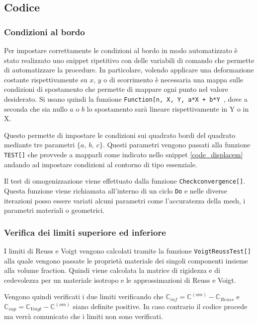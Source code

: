 \documentclass[a4paper,num-refs]{oup-contemporary}
\begin{document}
\subsection{Codice}

\subsubsection{Condizioni al bordo}

Per impostare correttamente le condizioni al bordo in modo automatizzato è stato realizzato uno snippet ripetitivo con delle variabili di comando che permette di automatizzare la procedure. In particolare, volendo applicare una deformazione costante rispettivamente su $x$, $y$ o  di scorrimento è necessaria una mappa sulle condizioni di spostamento che permette di mappare ogni punto  nel valore desiderato. Si usano quindi la funzione \texttt{Function[{n, X, Y}, a*X + b*Y }, dove a seconda che sia nullo $a$ o $b$ lo spostamento sarà lineare rispettivamente in Y o in X. 

 Questo permette di impostare le condizioni sui quadrato bordi del quadrato mediante tre parametri $\{a,\:b,\:c\}$. Questi parametri vengono passati alla funzione \texttt{TEST[]} che provvede a mapparli come indicato nello snippet  \ref{code_displacem} andando ad impostare condizioni al contorno di tipo essenziale.  

Il test di omogenizzazione viene effettuato dalla funzione \texttt{Checkconvergence[]}. Questa funzione viene richiamata all'interno di un ciclo \texttt{Do} e nelle diverse iterazioni posso essere variati alcuni parametri come l'accuratezza della mesh, i parametri materiali o geometrici. 


\subsubsection{Verifica dei limiti superiore ed inferiore}

I limiti di Reuss e Voigt vengono calcolati tramite la funzione \texttt{VoigtReussTest[]} alla quale vengono passate le proprietà materiale dei singoli componenti insieme alla volume fraction. Quindi viene calcolata la matrice di rigidezza e di cedevolezza per un materiale isotropo e le approssimazioni di Reuss e Voigt. 

Vengono quindi verificati i due limiti verificando che $\mathbb C_{inf}=\mathbb C^{(om)}-\mathbb C_{Reuss} $ e $\mathbb C_{sup}=\mathbb C_{Voigt} - \mathbb C^{(om)}$ siano definite positive. In caso contrario il codice procede ma verrà comunicato che i limiti non sono verificati. 
\end{document}
